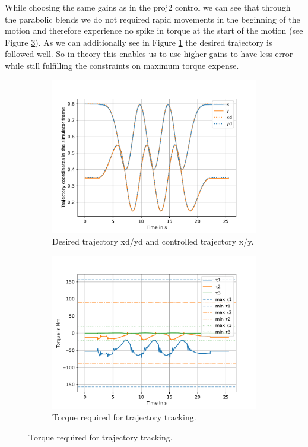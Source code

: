 While choosing the same gains as in the proj2 control we can see that through the parabolic blends we do not required rapid movements in the beginning of the motion and therefore experience no spike in torque at the start of the motion (see Figure \ref{fig:Proj3_tau}). As we can additionally see in Figure \ref{fig:Xd_yD_Proje3} the desired trajectory is followed well. So in theory this enables us to use higher gains to have less error while still fulfilling the constraints on maximum torque expense. 

\begin{figure}[H]
    \centering
    \begin{subfigure}[t]{0.48\textwidth}
        \centering
        \includegraphics[width=\textwidth]{SRC/Proj3X_Xd_y_yd.pdf} %
        \caption{Desired trajectory xd/yd and controlled trajectory x/y.}
        \label{fig:Xd_yD_Proje3}
    \end{subfigure}
    \hfill
    \begin{subfigure}[t]{0.48\textwidth}
        \centering
        \includegraphics[width=\textwidth]{SRC/Proj3Tau.pdf} %
        \caption{Torque required for trajectory tracking.}
        \label{fig:Proj3_tau}
    \end{subfigure}


\end{figure}
